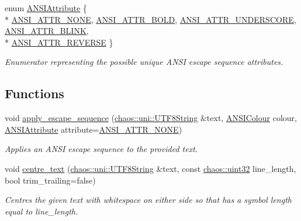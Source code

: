 \begin{DoxyCompactItemize}
\item 
enum \hyperlink{namespacechaos_1_1io_1_1format_af01119682ec0bc616b49641e0c2a7ccf}{A\+N\+S\+I\+Attribute} \{ \\*
\hyperlink{namespacechaos_1_1io_1_1format_af01119682ec0bc616b49641e0c2a7ccfa3154b286513beb167bb516ea15f1cfb5}{A\+N\+S\+I\+\_\+\+A\+T\+T\+R\+\_\+\+N\+O\+N\+E}, 
\hyperlink{namespacechaos_1_1io_1_1format_af01119682ec0bc616b49641e0c2a7ccfaada31e77e1e80ea78e0cd08a126271b3}{A\+N\+S\+I\+\_\+\+A\+T\+T\+R\+\_\+\+B\+O\+L\+D}, 
\hyperlink{namespacechaos_1_1io_1_1format_af01119682ec0bc616b49641e0c2a7ccfa2f1d142ccf489cba5710445abd48555f}{A\+N\+S\+I\+\_\+\+A\+T\+T\+R\+\_\+\+U\+N\+D\+E\+R\+S\+C\+O\+R\+E}, 
\hyperlink{namespacechaos_1_1io_1_1format_af01119682ec0bc616b49641e0c2a7ccfacd3671458d96396a0fec66c993244186}{A\+N\+S\+I\+\_\+\+A\+T\+T\+R\+\_\+\+B\+L\+I\+N\+K}, 
\\*
\hyperlink{namespacechaos_1_1io_1_1format_af01119682ec0bc616b49641e0c2a7ccfaa7b58f4c0365d47d2bc98a4587521806}{A\+N\+S\+I\+\_\+\+A\+T\+T\+R\+\_\+\+R\+E\+V\+E\+R\+S\+E}
 \}\begin{DoxyCompactList}\small\item\em Enumerator representing the possible unique A\+N\+S\+I escape sequence attributes. \end{DoxyCompactList}
\end{DoxyCompactItemize}
\subsection*{Functions}
\begin{DoxyCompactItemize}
\item 
void \hyperlink{namespacechaos_1_1io_1_1format_ae9aebf86c855cb5ed332902264a507b7}{apply\+\_\+escape\+\_\+sequence} (\hyperlink{classchaos_1_1uni_1_1_u_t_f8_string}{chaos\+::uni\+::\+U\+T\+F8\+String} \&text, \hyperlink{namespacechaos_1_1io_1_1format_aa30dcff2478ffc94e33504c8886a5b1a}{A\+N\+S\+I\+Colour} colour, \hyperlink{namespacechaos_1_1io_1_1format_af01119682ec0bc616b49641e0c2a7ccf}{A\+N\+S\+I\+Attribute} attribute=\hyperlink{namespacechaos_1_1io_1_1format_af01119682ec0bc616b49641e0c2a7ccfa3154b286513beb167bb516ea15f1cfb5}{A\+N\+S\+I\+\_\+\+A\+T\+T\+R\+\_\+\+N\+O\+N\+E})
\begin{DoxyCompactList}\small\item\em Applies an A\+N\+S\+I escape sequence to the provided text. \end{DoxyCompactList}\item 
void \hyperlink{namespacechaos_1_1io_1_1format_ac53c87508bb81f6fc26efd9bfca7b027}{centre\+\_\+text} (\hyperlink{classchaos_1_1uni_1_1_u_t_f8_string}{chaos\+::uni\+::\+U\+T\+F8\+String} \&text, const \hyperlink{namespacechaos_a3b3a47ba1e284655bf1a30c441121c60}{chaos\+::uint32} line\+\_\+length, bool trim\+\_\+trailing=false)
\begin{DoxyCompactList}\small\item\em Centres the given text with whitespace on either side so that has a symbol length equal to line\+\_\+length. \end{DoxyCompactList}\end{DoxyCompactItemize}


